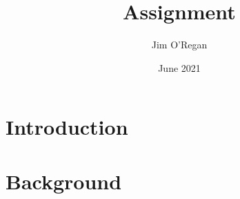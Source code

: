 \documentclass{article}[11pt]
\title{Assignment}
\author{Jim O'Regan}
\date{June 2021}
\begin{document}
\maketitle

\section{Introduction}



\section{Background}




\end{document}
